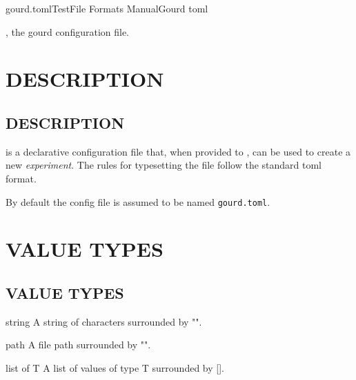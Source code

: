 \documentclass[a4paper,english]{article}
\begin{document}
	\pagestyle{fancy}

  \begin{Name}{5}{gourd.toml}{Test}{File Formats Manual}{Gourd toml}
    \begin{adjustwidth}{18pt}{0pt}
      , the gourd configuration file.
    \end{adjustwidth}
  \end{Name}

  \section*{DESCRIPTION}
    \begin{adjustwidth}{18pt}{0pt}
  \section{DESCRIPTION}

      \noindent {} is a declarative configuration file that, when provided to , can be used to create a new \emph{experiment}.
      The rules for typesetting the file follow the standard toml format.

      \begin{Description}[Files]\setlength{\itemsep}{0cm}
          \item[\File{gourd.toml}] By default the config file is assumed to be named \texttt{gourd.toml}.
      \end{Description}

    \end{adjustwidth}

  \section*{VALUE TYPES}
    \begin{adjustwidth}{18pt}{0pt}
  \section{VALUE TYPES}

    \begin{Description}[Types]\setlength{\itemsep}{0cm}
        \item[string] A string of characters surrounded by "".
        \item[path] A file path surrounded by "".
        \item[list of T] A list of values of type T surrounded by [].
    \end{Description}

    \end{adjustwidth}
\end{document}
